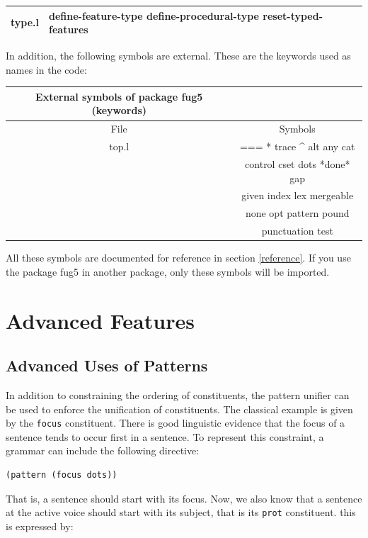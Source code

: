 \documentclass[10pt,a4paper]{report}
\begin{document}
\begin{appendices}
\begin{center}
\begin{tabular}{|l|l|}
type.l&define-feature-type
define-procedural-type
reset-typed-features \\ \hline
\end{tabular}
\end{center}


In addition, the following symbols are external. These are the
keywords used as names in the code:

\begin{center}
\begin{tabular}{|c|c|}
External symbols of package fug5 (keywords) \\ \hline
File & Symbols \\ \hline
top.l&===
	   * 
	   trace
	   \^{}
	   alt
	   any
	   cat \\
&	   control
	   cset
	   dots
	   *done*
	   gap \\
&	   given
	   index
	   lex
	   mergeable \\
&	   none
	   opt
	   pattern
	   pound \\
&	   punctuation
	   test \\ \hline
\end{tabular}
\end{center}

All these symbols are documented for reference in section \ref{reference}.
If you use the package fug5 in another package, only these
symbols will be imported.


\chapter{Advanced Features}
\label{advanced}

\section{Advanced Uses of Patterns}

In addition to constraining the ordering of constituents, the pattern unifier
can be used to enforce the unification of constituents.  The classical
example is given by the {\tt focus} constituent. There is good linguistic
evidence that the focus of a sentence tends to occur first in a sentence.
To represent this constraint, a grammar can include the following
directive:

\begin{lstlisting}
(pattern (focus dots))
\end{lstlisting}

That is, a sentence should start with its focus.
Now, we also know that a sentence at the active voice should start with
its subject, that is its {\tt prot} constituent. this is expressed by:


\end{appendices}
\end{document}
